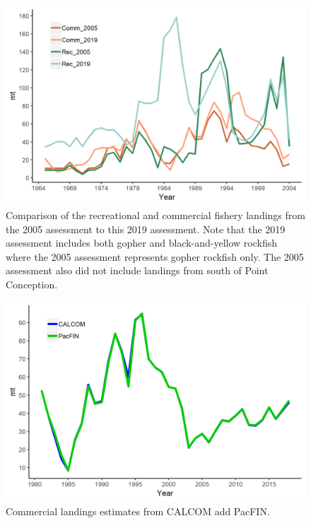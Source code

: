 \documentclass[12pt,]{article}
\begin{document}
\begin{figure}
\centering
\includegraphics{Figures/assessment_compare.png}
\caption{Comparison of the recreational and commercial fishery landings
from the 2005 assessment to this 2019 assessment. Note that the 2019
assessment includes both gopher and black-and-yellow rockfish where the
2005 assessment represents gopher rockfish only. The 2005 assessment
also did not include landings from south of Point Conception.
\label{fig:Assessment_compare}}
\end{figure}

\begin{figure}
\centering
\includegraphics{Figures/Calcom_vs_Pacfin.png}
\caption{Commercial landings estimates from CALCOM add PacFIN.
\label{fig:Calcom_vs_Pacfin}}
\end{figure}
\end{document}
